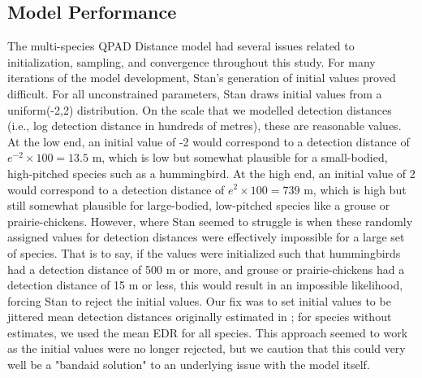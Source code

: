 \documentclass[12pt]{article}
\begin{document}
\subsection{Model Performance}

\par The multi-species QPAD Distance model had several issues related to initialization, sampling, and convergence throughout this study.
For many iterations of the model development, Stan's generation of initial values proved difficult.
For all unconstrained parameters, Stan draws initial values from a uniform(-2,2) distribution.
On the scale that we modelled detection distances (i.e., log detection distance in hundreds of metres), these are reasonable values.
At the low end, an initial value of -2 would correspond to a detection distance of $e^{-2} \times 100 = 13.5$ m, which is low but somewhat plausible for a small-bodied, high-pitched species such as a hummingbird.
At the high end, an initial value of 2 would correspond to a detection distance of $e^{2} \times 100 = 739$ m, which is high but still somewhat plausible for large-bodied, low-pitched species like a grouse or prairie-chickens.
However, where Stan seemed to struggle is when these randomly assigned values for detection distances were effectively impossible for a large set of species.
That is to say, if the values were initialized such that hummingbirds had a detection distance of 500 m or more, and grouse or prairie-chickens had a detection distance of 15 m or less, this would result in an impossible likelihood, forcing Stan to reject the initial values.
Our fix was to set initial values to be jittered mean detection distances originally estimated in \citet{edwards_point_2023}; for species without estimates, we used the mean EDR for all species.
This approach seemed to work as the initial values were no longer rejected, but we caution that this could very well be a "bandaid solution" to an underlying issue with the model itself.
\end{document}
